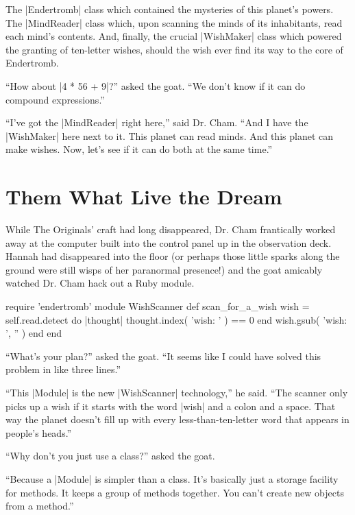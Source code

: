 \documentclass[12pt,twoside]{report}
\begin{document}
The \rubyinline|Endertromb| class which contained the
mysteries of this planet's powers.  The
\rubyinline|MindReader| class which, upon scanning the
minds of its inhabitants, read each mind's contents.  And, finally,
the crucial \rubyinline|WishMaker| class which powered
the granting of ten-letter wishes, should the wish ever find its way
to the core of Endertromb.

``How about \rubyinline|4 * 56 + 9|?'' asked the goat.
``We don't know if it can do compound expressions.''

``I've got the \rubyinline|MindReader| right here,''
said Dr. Cham.  ``And I have the
\rubyinline|WishMaker| here next to it. This planet
can read minds.  And this planet can make wishes.  Now, let's see if
it can do both at the same time.''


\section{Them What Live the Dream}


While The Originals' craft had long disappeared, Dr. Cham frantically
worked away at the computer built into the control panel up in the
observation deck.  Hannah had disappeared into the floor (or perhaps
those little sparks along the ground were still wisps of her
paranormal presence!) and the goat amicably watched Dr. Cham hack out
a Ruby module.


\begin{rubycode}

 require 'endertromb'
 module WishScanner
   def scan_for_a_wish
     wish = self.read.detect do |thought|
       thought.index( 'wish: ' ) == 0
     end
     wish.gsub( 'wish: ', '' )
   end
 end

\end{rubycode}


``What's your plan?'' asked the goat.  ``It seems like I could have
solved this problem in like three lines.''

``This \rubyinline|Module| is the new
\rubyinline|WishScanner| technology,'' he said.  ``The
scanner only picks up a wish if it starts with the word
\rubyinline|wish| and a colon and a space.  That way
the planet doesn't fill up with every less-than-ten-letter word that
appears in people's heads.''

``Why don't you just use a class?'' asked the goat.

``Because a \rubyinline|Module| is simpler than a
class.  It's basically just a storage facility for methods.  It keeps
a group of methods together.  You can't create new objects from a
method.''
\end{document}
